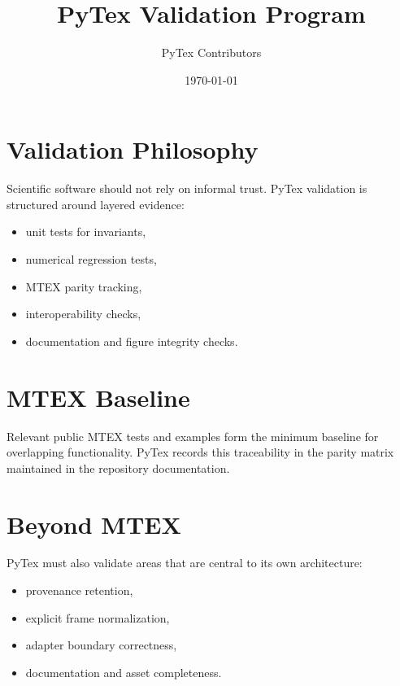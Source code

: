 \documentclass[11pt]{article}
\title{PyTex Validation Program}
\author{PyTex Contributors}
\date{\today}
\begin{document}
\maketitle

\section{Validation Philosophy}

Scientific software should not rely on informal trust. PyTex validation is structured around layered evidence:

\begin{itemize}
  \item unit tests for invariants,
  \item numerical regression tests,
  \item MTEX parity tracking,
  \item interoperability checks,
  \item documentation and figure integrity checks.
\end{itemize}

\section{MTEX Baseline}

Relevant public MTEX tests and examples form the minimum baseline for overlapping functionality. PyTex records this traceability in the parity matrix maintained in the repository documentation.

\section{Beyond MTEX}

PyTex must also validate areas that are central to its own architecture:

\begin{itemize}
  \item provenance retention,
  \item explicit frame normalization,
  \item adapter boundary correctness,
  \item documentation and asset completeness.
\end{itemize}
\end{document}
